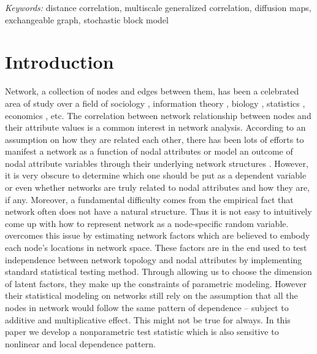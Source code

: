 \documentclass[12pt]{article}
\theoremstyle{definition}
\begin{document}
	\noindent%
	{\it Keywords:} distance correlation, multiscale generalized correlation, diffusion maps, exchangeable graph, stochastic block model 
	\vfill
	
	\newpage
	\section{Introduction}
	\label{sec:intro}

Network, a collection of nodes and edges between them, has been a celebrated area of study over a field of sociology \citep{pinquart2000influences, ellison2007benefits}, information theory \citep{gross2005information}, biology \citep{barabasi2004network, pujol2010unveiling}, statistics \citep{raftery2012fast, palla2012infinite}, economics \citep{banerjee2013diffusion}, etc. The correlation between network relationship between nodes and their attribute values is a common interest in network analysis. According to an assumption on how they are related each other, there has been lots of efforts to manifest a network as a function of nodal attributes \citep{wasserman1996logit, howard2016understanding} or model an outcome of nodal attribute variables through their underlying network structures \citep{christakis2007spread, christakis2008collective}. However, it is very obscure to determine which one should be put as a dependent variable or even whether networks are truly related to nodal attributes and how they are, if any. Moreover, a fundamental difficulty comes from the empirical fact that network often does not have a natural structure. Thus it is not easy to intuitively come up with how to represent network as a node-specific random variable. \cite{fosdick2015testing} overcomes this issue by estimating network factors which are believed to embody each node's locations in network space. These factors are in the end used to test independence between network topology and nodal attributes by implementing standard statistical testing method. Through allowing us to choose the dimension of latent factors, they make up the constraints of parametric modeling. However their statistical modeling on networks still rely on the assumption that all the nodes in network would follow the same pattern of dependence -- subject to additive and multiplicative effect. This might not be true for always. In this paper we develop a nonparametric test statistic which is also sensitive to nonlinear and local dependence pattern.  
\end{document}
